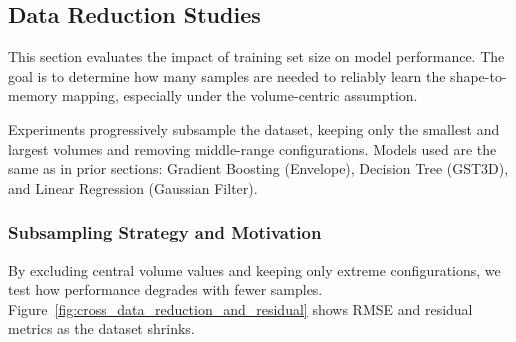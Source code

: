 \subsection{Data Reduction Studies}
\label{subsec:pmc-results-data-reduction-studies}

This section evaluates the impact of training set size on model performance.
The goal is to determine how many samples are needed to reliably learn the shape-to-memory mapping, especially under the volume-centric assumption.

Experiments progressively subsample the dataset, keeping only the smallest and largest volumes and removing middle-range configurations.
Models used are the same as in prior sections: Gradient Boosting (Envelope), Decision Tree (\ac{GST3D}), and Linear Regression (Gaussian Filter).

\subsubsection{Subsampling Strategy and Motivation}
\label{subsec:data-reduction-strategy-and-motivation}

By excluding central volume values and keeping only extreme configurations, we test how performance degrades with fewer samples.
Figure~\ref{fig:cross_data_reduction_and_residual} shows \ac{RMSE} and residual metrics as the dataset shrinks.


